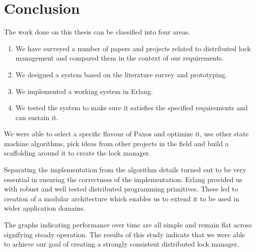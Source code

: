 \chapter{Conclusion}
\label{chapter:conclusion}

The work done on this thesis can be classified into four areas.

\begin{enumerate}
  \item We have surveyed a number of papers and projects related to distributed
    lock management and compared them in the context of our requirements.
  \item We designed a system based on the literature survey and prototyping.
  \item We implemented a working system in Erlang.
  \item We tested the system to make sure it satisfies the specified
    requirements and can sustain it.
\end{enumerate}

We were able to select a specific flavour of Paxos and optimize it, use other
state machine algorithms, pick ideas from other projects in the field and build 
a scaffolding around it to create the lock manager. 

Separating the implementation from the algorithm details turned out
to be very essential in ensuring the correctness of the implementation. Erlang
provided us with robust and well tested distributed programming primitives. 
These led to creation of a modular architecture which enables us to extend
it to be used in wider application domains.

The graphs indicating performance over time are all simple and remain flat
across signifying steady operation. The results of this study indicate that
we were able to achieve our goal of creating a strongly consistent
distributed lock manager.

